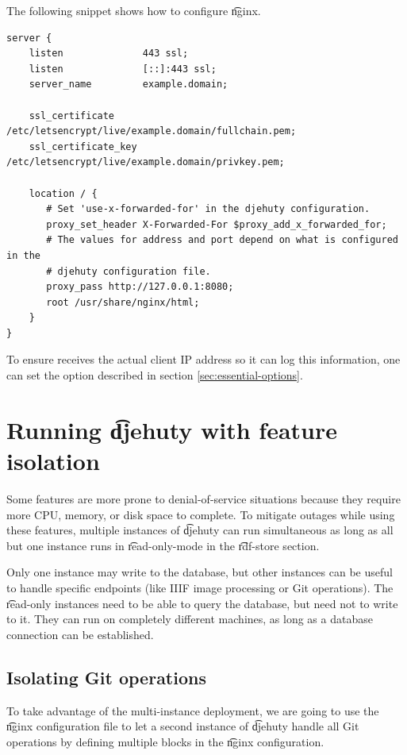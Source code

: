   The following snippet shows how to configure \t{nginx}.

\begin{lstlisting}
server {
    listen              443 ssl;
    listen              [::]:443 ssl;
    server_name         example.domain;

    ssl_certificate     /etc/letsencrypt/live/example.domain/fullchain.pem;
    ssl_certificate_key /etc/letsencrypt/live/example.domain/privkey.pem;

    location / {
       # Set 'use-x-forwarded-for' in the djehuty configuration.
       proxy_set_header X-Forwarded-For $proxy_add_x_forwarded_for;
       # The values for address and port depend on what is configured in the
       # djehuty configuration file.
       proxy_pass http://127.0.0.1:8080;
       root /usr/share/nginx/html;
    }
}
\end{lstlisting}

  To ensure  receives the actual client IP address so it can log
  this information, one can set the  option
  described in section \ref{sec:essential-options}.

\section{Running \t{djehuty} with feature isolation}

Some features are more prone to denial-of-service situations because they
require more CPU, memory, or disk space to complete.  To mitigate outages while
using these features, multiple instances of \t{djehuty} can run simultaneous
as long as all but one instance runs in \t{read-only-mode} in the \t{rdf-store}
section.

Only one instance may write to the database, but other instances can be useful
to handle specific endpoints (like IIIF image processing or Git operations).  The
\t{read-only} instances need to be able to query the database, but need not to
write to it.  They can run on completely different machines, as long as a database
connection can be established.

\subsection{Isolating Git operations}
\label{sec:isolating-git-ops}

To take advantage of the multi-instance deployment, we are going to use the \t{nginx}
configuration file to let a second instance of \t{djehuty} handle all Git operations
by defining multiple  blocks in the \t{nginx} configuration.

